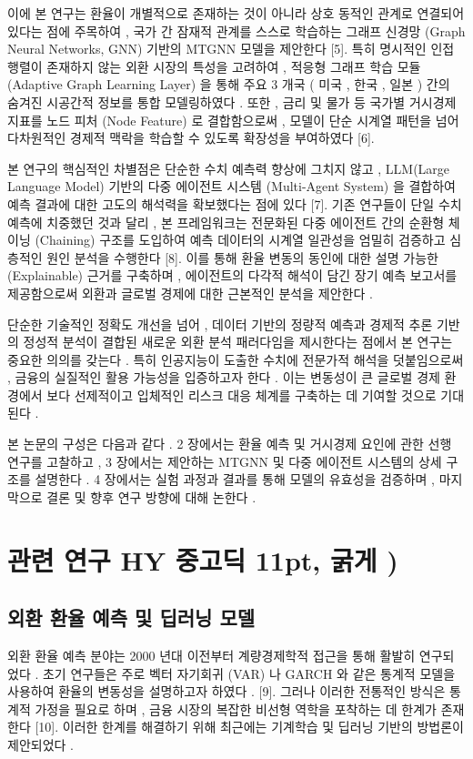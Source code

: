 \documentclass[10pt,a4paper]{article}
\begin{document}
이에 본 연구는 환율이 개별적으로 존재하는 것이 아니라 상호 동적인 관계로 연결되어 있다는 점에 주목하여 , 국가 간 잠재적 관계를 스스로 학습하는 그래프 신경망 (Graph Neural Networks, GNN) 기반의 MTGNN 모델을 제안한다 [5]. 특히 명시적인 인접 행렬이 존재하지 않는 외환 시장의 특성을 고려하여 , 적응형 그래프 학습 모듈 (Adaptive Graph Learning Layer) 을 통해 주요 3 개국 ( 미국 , 한국 , 일본 ) 간의 숨겨진 시공간적 정보를 통합 모델링하였다 . 또한 , 금리 및 물가 등 국가별 거시경제 지표를 노드 피처 (Node Feature) 로 결합함으로써 , 모델이 단순 시계열 패턴을 넘어 다차원적인 경제적 맥락을 학습할 수 있도록 확장성을 부여하였다 [6].

본 연구의 핵심적인 차별점은 단순한 수치 예측력 향상에 그치지 않고 , LLM(Large Language Model) 기반의 다중 에이전트 시스템 (Multi-Agent System) 을 결합하여 예측 결과에 대한 고도의 해석력을 확보했다는 점에 있다 [7]. 기존 연구들이 단일 수치 예측에 치중했던 것과 달리 , 본 프레임워크는 전문화된 다중 에이전트 간의 순환형 체이닝 (Chaining) 구조를 도입하여 예측 데이터의 시계열 일관성을 엄밀히 검증하고 심층적인 원인 분석을 수행한다 [8]. 이를 통해 환율 변동의 동인에 대한 설명 가능한 (Explainable) 근거를 구축하며 , 에이전트의 다각적 해석이 담긴 장기 예측 보고서를 제공함으로써 외환과 글로벌 경제에 대한 근본적인 분석을 제안한다 .

단순한 기술적인 정확도 개선을 넘어 , 데이터 기반의 정량적 예측과 경제적 추론 기반의 정성적 분석이 결합된 새로운 외환 분석 패러다임을 제시한다는 점에서 본 연구는 중요한 의의를 갖는다 . 특히 인공지능이 도출한 수치에 전문가적 해석을 덧붙임으로써 , 금융의 실질적인 활용 가능성을 입증하고자 한다 . 이는 변동성이 큰 글로벌 경제 환경에서 보다 선제적이고 입체적인 리스크 대응 체계를 구축하는 데 기여할 것으로 기대된다 .

본 논문의 구성은 다음과 같다 . 2 장에서는 환율 예측 및 거시경제 요인에 관한 선행 연구를 고찰하고 , 3 장에서는 제안하는 MTGNN 및 다중 에이전트 시스템의 상세 구조를 설명한다 . 4 장에서는 실험 과정과 결과를 통해 모델의 유효성을 검증하며 , 마지막으로 결론 및 향후 연구 방향에 대해 논한다 .

\section{관련 연구 HY 중고딕 11pt, 굵게 )}
\subsection{외환 환율 예측 및 딥러닝 모델}
외환 환율 예측 분야는 2000 년대 이전부터 계량경제학적 접근을 통해 활발히 연구되었다 . 초기 연구들은 주로 벡터 자기회귀 (VAR) 나 GARCH 와 같은 통계적 모델을 사용하여 환율의 변동성을 설명하고자 하였다 . [9]. 그러나 이러한 전통적인 방식은 통계적 가정을 필요로 하며 , 금융 시장의 복잡한 비선형 역학을 포착하는 데 한계가 존재한다 [10]. 이러한 한계를 해결하기 위해 최근에는 기계학습 및 딥러닝 기반의 방법론이 제안되었다 .
\end{document}
